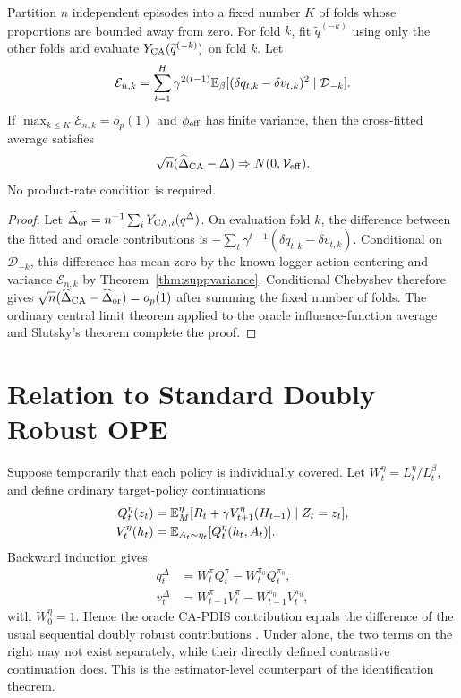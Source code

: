 \begin{corollary}
\label{cor:crossfiteff}
Partition $n$ independent episodes into a fixed number $K$ of folds whose proportions are bounded away from zero. For fold $k$, fit $\widetilde q^{(-k)}$ using only the other folds and evaluate $Y_{\rm CA}(\widetilde q^{(-k)})$ on fold $k$. Let
\[
\mathcal E_{n,k}=\sum_{t=1}^H\gamma^{2(t-1)}
\mathbb{E}_\beta[(\delta q_{t,k}-\delta v_{t,k})^2\mid\mathcal D_{-k}].
\]
If $\max_{k\le K}\mathcal E_{n,k}=o_p(1)$ and
$\phi_{\rm eff}$ has finite variance, then the cross-fitted average satisfies
\[
\sqrt n(\widehat\Delta_{\rm CA}-\Delta)
\Rightarrow N(0,\mathcal V_{\rm eff}).
\]
No product-rate condition is required.
\end{corollary}
\begin{proof}
Let $\widehat\Delta_{\rm or}=n^{-1}\sum_iY_{{\rm CA},i}(q^\Delta)$. On evaluation fold $k$, the difference between the fitted and oracle contributions is
$-\sum_t\gamma^{t-1}(\delta q_{t,k}-\delta v_{t,k})$.
Conditional on $\mathcal D_{-k}$, this difference has mean zero by the known-logger action centering and variance $\mathcal E_{n,k}$ by Theorem~\ref{thm:suppvariance}. Conditional Chebyshev therefore gives
$\sqrt n(\widehat\Delta_{\rm CA}-\widehat\Delta_{\rm or})=o_p(1)$ after summing the fixed number of folds. The ordinary central limit theorem applied to the oracle influence-function average and Slutsky's theorem complete the proof.
\end{proof}

\section{Relation to Standard Doubly Robust OPE}

Suppose temporarily that each policy is individually covered. Let
$W_t^\eta=L_t^\eta/L_t^\beta$, and define ordinary target-policy continuations
\begin{align*}
Q_t^\eta(z_t)&=\mathbb{E}_M^\eta[R_t+\gamma V_{t+1}^\eta(H_{t+1})\mid Z_t=z_t],\\
V_t^\eta(h_t)&=\mathbb{E}_{A_t\sim\eta_t}[Q_t^\eta(h_t,A_t)].
\end{align*}
Backward induction gives
\begin{align*}
q_t^\Delta&=W_t^\pi Q_t^\pi-W_t^{\pi_0}Q_t^{\pi_0},\\
v_t^\Delta&=W_{t-1}^\pi V_t^\pi-W_{t-1}^{\pi_0}V_t^{\pi_0},
\end{align*}
with $W_0^\eta=1$. Hence the oracle CA-PDIS contribution equals the difference of the usual sequential doubly robust contributions \citep{jiang2016doubly,thomas2016data}. Under \UCC alone, the two terms on the right may not exist separately, while their directly defined contrastive continuation does. This is the estimator-level counterpart of the identification theorem.

